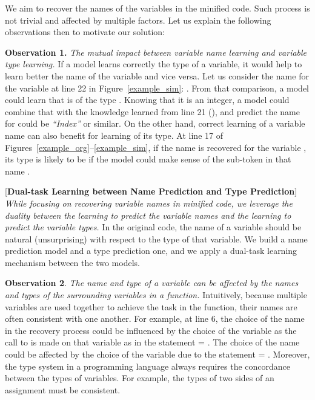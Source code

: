 We aim to recover the names of the variables in the minified
code. Such process is not trivial and affected by multiple factors.
Let us explain the following observations then to motivate our
solution:

\vspace{2pt} \textbf{Observation 1.} {\em The mutual impact between
  variable name learning and variable type learning.} If a model
learns correctly the type of a variable, it would help to learn better
the name of the variable and vice versa. Let us consider the name
 for the variable  at line 22 in
Figure~\ref{example_sim}: . From that comparison, a
model could learn that  is of the type . Knowing
that it is an integer, a model could combine that with the knowledge
learned from line 21 (), and predict the
name for  could be {\em ``Index''} or similar. On the other
hand, correct learning of a variable name can also benefit for
learning of its type. At line 17 of
Figures~\ref{example_org}--\ref{example_sim}, if the name
 is recovered for the variable ,
its type is likely to be  if the model could make sense of
the sub-token  in that name .

\vspace{2pt}  [{\bf Dual-task Learning
    between Name Prediction and Type Prediction}] {\em While focusing
  on recovering variable names in minified code, we leverage the
  duality between the learning to predict the variable names and the
  learning to predict the variable types.} In the original code, the
name of a variable should be natural (unsurprising) with respect to
the type of that variable. We build a name prediction model and a type
prediction one, and we apply a dual-task learning mechanism between
the two models.

\vspace{2pt}
\textbf{Observation 2}. {\em The name and type of a variable can be
  affected by the names and types of the surrounding variables in a
  function.}  Intuitively, because multiple variables are used
together to achieve the task in the function, their names are
often consistent with one another. For example, at line 6, the choice
of the name  in the recovery process could be influenced
by the choice of the variable  as the call to
 is made on that variable as in the statement
 = . The choice of the name
 could be affected by the choice of the
variable  due to the statement  =
. Moreover, the type system in a programming
language always requires the concordance between the types of
variables. For example, the types of two sides of an assignment must
be consistent.

